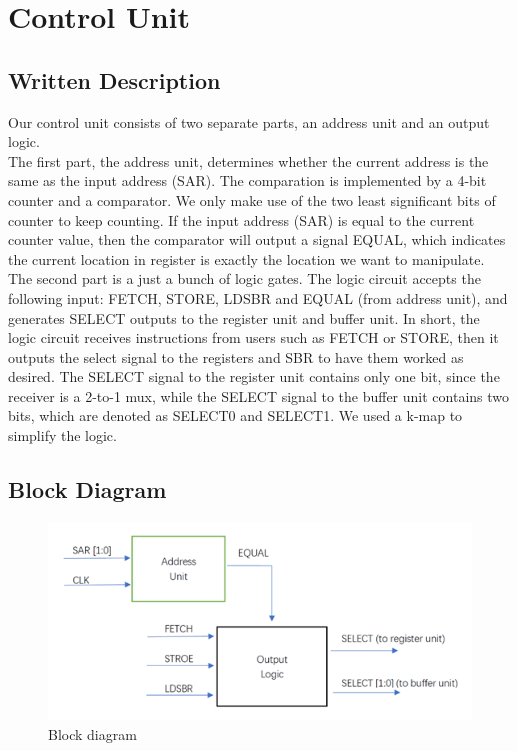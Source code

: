 \documentclass[12pt]{article}
\begin{document}
\section{Control Unit}
\subsection{\textbf{Written Description}}
Our control unit consists of two separate parts, an address unit and an output logic. \\

The first part, the address unit, determines whether the current address is the same as the input address (SAR). The comparation is implemented by a 4-bit counter and a comparator. We only make use of the two least significant bits of counter to keep counting. If the input address (SAR) is equal to the current counter value, then the comparator will output a signal EQUAL, which indicates the current location in register is exactly the location we want to manipulate. \\

The second part is a just a bunch of logic gates. The logic circuit accepts the following input: FETCH, STORE, LDSBR and EQUAL (from address unit), and generates SELECT outputs to the register unit and buffer unit. In short, the logic circuit receives instructions from users such as FETCH or STORE, then it outputs the select signal to the registers and SBR to have them worked as desired. The SELECT signal to the register unit contains only one bit, since the receiver is a 2-to-1 mux, while the SELECT signal to the buffer unit contains two bits, which are denoted as SELECT0 and SELECT1. We used a k-map to simplify the logic.

\subsection{\textbf{Block Diagram}}
\begin{figure}[H]
    \centering
    \includegraphics[scale=1.2]{block_diagram.png}
    \caption{Block diagram}
\end{figure}
\end{document}
